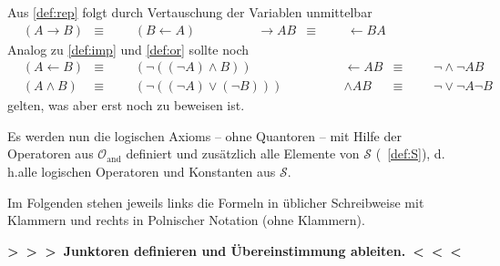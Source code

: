 \documentclass[english,ngerman,parskip=half,headsepline,footsepline,
	fleqn,notitlepage]{scrreprt}
\makeatletter
\newcommand*{\lrep}{\leftarrow}%
\newcommand*{\limp}{\rightarrow}%
\newcommand*{\asS}{\mathcal{S}}%
\newcommand*{\asO}{\mathcal{O}}%
\newcommand*{\asOand}{\asO_\mathrm{and}}
\newcommand*{\formulatoleft}{&&&&&&&&&&}%
\newcommand*{\formulaspace}{&&&&}%
\newcommand*{\todo}[1]{\textbf{>~>~>~#1~<~<~<}}%
\newcommand*{\subsubsectionname}{Paragraph}
\newcommand*{\textdh}{d.\@\,h.\@ }
\newcommand*{\glsidxPl}[1]{\glspl{#1}\idx{\gls{#1}}}%
\makeatother
\begin{document}
	Aus \ref{def:rep} folgt durch Vertauschung der Variablen unmittelbar
	\begin{align}
		&                 (A \limp B) & \equiv & & & (B \lrep A)
		& \formulaspace &   \limp A B & \equiv & & & \lrep B A
		\label{eq:imp}   \formulatoleft
	\end{align}
	Analog zu \ref{def:imp} und \ref{def:or} sollte noch
	\begin{align}
		&                 (A \lrep B) & \equiv & & & (\lnot ((\lnot A) \land B))
		& \formulaspace &   \lrep A B & \equiv & & & \lnot \land \lnot A B
		\label{eq:ref}   \\
		&             (A \land B) & \equiv & & & (\lnot((\lnot A)\lor(\lnot B)))
		& \formulaspace &   \land A B & \equiv & & & \lnot \lor \lnot A \lnot B
		\label{eq:and}    \formulatoleft
	\end{align}
	gelten, was aber erst noch zu beweisen ist.

	Es werden nun die logischen \glsidxPl{Axiom}
	-- ohne Quantoren --
	mit Hilfe der Operatoren aus $\asOand$ definiert
	und zusätzlich alle Elemente von $\asS$ (\seename~\vref{def:S}),
	\textdh alle logischen Operatoren und Konstanten aus $\asS$.

	Im Folgenden stehen jeweils
	links die Formeln in üblicher Schreibweise mit Klammern
	und rechts in Polnischer Notation (ohne Klammern).

\todo{Junktoren definieren und Übereinstimmung ableiten.}%
\end{document}
